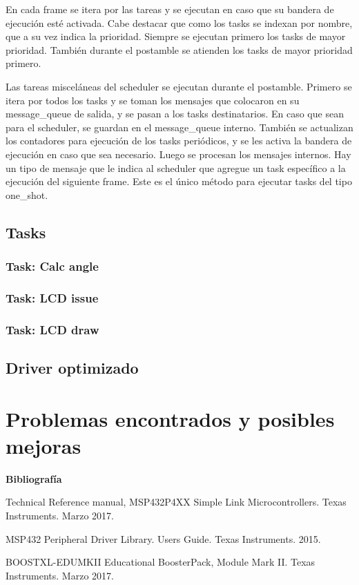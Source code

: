 En cada frame se itera por las tareas y se ejecutan en caso que su bandera de ejecución esté
activada. Cabe destacar que como los tasks se indexan por nombre, que a su vez indica la
prioridad. Siempre se ejecutan primero los tasks de mayor prioridad. También durante el postamble se
atienden los tasks de mayor prioridad primero. 

Las tareas misceláneas del scheduler se ejecutan durante el postamble. Primero se itera por todos
los tasks y se toman los mensajes que colocaron en su message\_queue de salida, y se pasan a los
tasks destinatarios. En caso que sean para el scheduler, se guardan en el message\_queue
interno. También se actualizan los contadores para ejecución de los tasks periódicos, y se les
activa la bandera de ejecución en caso que sea necesario. Luego se procesan los mensajes internos.
Hay un tipo de mensaje que le indica al scheduler que agregue un task específico a la ejecución del
siguiente frame. Este es el único método para ejecutar tasks del tipo one\_shot.


\subsection{Tasks}
\label{sec:tasks}

\subsubsection{Task: Calc angle}
\label{sec:calc_angle}
\subsubsection{Task: LCD issue}
\label{sec:lcd_issue}
\subsubsection{Task: LCD draw}
\label{sec:lcd_draw}
\subsection{Driver optimizado}

\section{Problemas encontrados y posibles mejoras}


\textbf{ Bibliografía}

Technical Reference manual, MSP432P4XX Simple Link Microcontrollers. Texas Instruments. Marzo 2017.

MSP432 Peripheral Driver Library. Users Guide. Texas Instruments. 2015.

BOOSTXL-EDUMKII Educational BoosterPack, Module Mark II. Texas Instruments. Marzo 2017.


%
%

